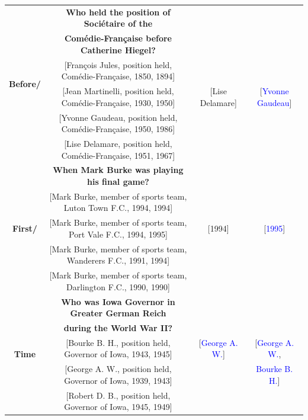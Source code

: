 \documentclass[11pt]{article}
\begin{document}
\begin{table}[t]
{\begin{tabular}{c|c|c|c}
 \midrule
    \multirow{6}{*}{\textbf{Before/}}&\textbf{Who held the position of Sociétaire of the }& &\\
    \multirow{6}{*}{\textbf{After}}& \textbf{ Comédie-Française before Catherine Hiegel?}&&\\
    &[François Jules, position held, Comédie-Française, 1850, 1894]& &\\
     &[Jean Martinelli, position held, Comédie-Française, 1930, 1950]&[Lise Delamare]&[\textcolor{blue}{Yvonne Gaudeau}]\\
     & [Yvonne Gaudeau, position held, Comédie-Française, 1950, 1986]&&\\
     &[Lise Delamare, position held, Comédie-Française, 1951, 1967]&&\\
    
      \midrule
      \multirow{5}{*}{\textbf{First/}}&\textbf{When Mark Burke was playing his final game?}& &\\
    \multirow{5}{*}{\textbf{Last}}&  [Mark Burke, member of sports team, Luton Town F.C., 1994, 1994]&&\\
    &[Mark Burke, member of sports team, Port Vale F.C., 1994, 1995]& [1994]&[\textcolor{blue}{1995}]\\
     &[Mark Burke, member of sports team, Wanderers F.C., 1991, 1994]&&\\
     & [Mark Burke, member of sports team, Darlington F.C., 1990, 1990]&&\\
     
      \midrule
     \multirow{5}{*}{\textbf{Time}}&\textbf{Who was Iowa Governor in Greater German Reich }& &\\
    \multirow{5}{*}{\textbf{Join}}&  \textbf{during the World War II?}&& \\
    &[Bourke B. H., position held, Governor of Iowa, 1943, 1945]&[\textcolor{blue}{George A. W.}]&[\textcolor{blue}{George A. W.},\\
     &[George A. W., position held, Governor of Iowa, 1939, 1943]&&\textcolor{blue}{Bourke B. H.}]\\
     &[Robert D. B., position held, Governor of Iowa, 1945, 1949]& &\\


\end{tabular}}
\end{table}
\end{document}
